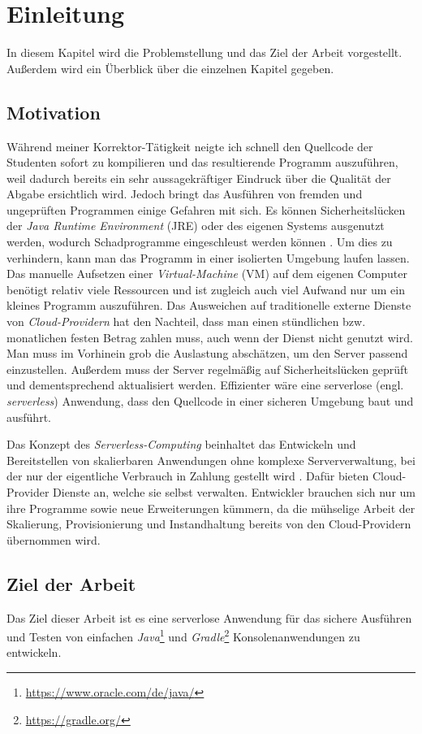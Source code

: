 \chapter{Einleitung}
In diesem Kapitel wird die Problemstellung und das Ziel der Arbeit vorgestellt.
Außerdem wird ein Überblick über die einzelnen Kapitel gegeben.

\section{Motivation}
Während meiner Korrektor-Tätigkeit neigte ich schnell den Quellcode der Studenten sofort zu kompilieren
und das resultierende Programm auszuführen, 
weil dadurch bereits ein sehr aussagekräftiger Eindruck über die Qualität der Abgabe ersichtlich wird. 
Jedoch bringt das Ausführen von fremden und ungeprüften Programmen einige Gefahren mit sich.
Es können Sicherheitslücken der \textit{Java Runtime Environment} (JRE) \cite{Jre}
oder des eigenen Systems ausgenutzt werden, wodurch Schadprogramme eingeschleust
werden können \cite{CveJreVuln}.
Um dies zu verhindern, kann man das Programm in einer isolierten Umgebung laufen lassen.
Das manuelle Aufsetzen einer \textit{Virtual-Machine} (VM) \cite{RedHatVM} auf dem eigenen Computer
benötigt relativ viele Ressourcen und ist zugleich auch viel Aufwand nur um ein kleines Programm auszuführen.
Das Ausweichen auf traditionelle externe Dienste von \textit{Cloud-Providern} hat den Nachteil,
dass man einen stündlichen bzw. monatlichen festen Betrag zahlen muss,
auch wenn der Dienst nicht genutzt wird. Man muss im Vorhinein grob die Auslastung abschätzen,
um den Server passend einzustellen. Außerdem muss der Server regelmäßig auf
Sicherheitslücken geprüft und dementsprechend aktualisiert werden.
Effizienter wäre eine serverlose (engl. \textit{serverless}) Anwendung, dass den
Quellcode in einer sicheren Umgebung baut und ausführt.

Das Konzept des \textit{Serverless-Computing} beinhaltet das Entwickeln und Bereitstellen
von skalierbaren Anwendungen ohne komplexe Serververwaltung, bei der nur der eigentliche Verbrauch
in Zahlung gestellt wird \cite{CioGov}.
Dafür bieten Cloud-Provider Dienste an, welche sie selbst
verwalten. Entwickler brauchen sich nur um ihre Programme sowie neue Erweiterungen kümmern,
da die mühselige Arbeit der Skalierung, Provisionierung und Instandhaltung
bereits von den Cloud-Providern übernommen wird.

\section{Ziel der Arbeit}
Das Ziel dieser Arbeit ist es eine serverlose Anwendung für das sichere Ausführen und Testen
von einfachen \textit{Java}\footnote{\url{https://www.oracle.com/de/java/}} und
\textit{Gradle}\footnote{\url{https://gradle.org/}} Konsolenanwendungen zu entwickeln.

